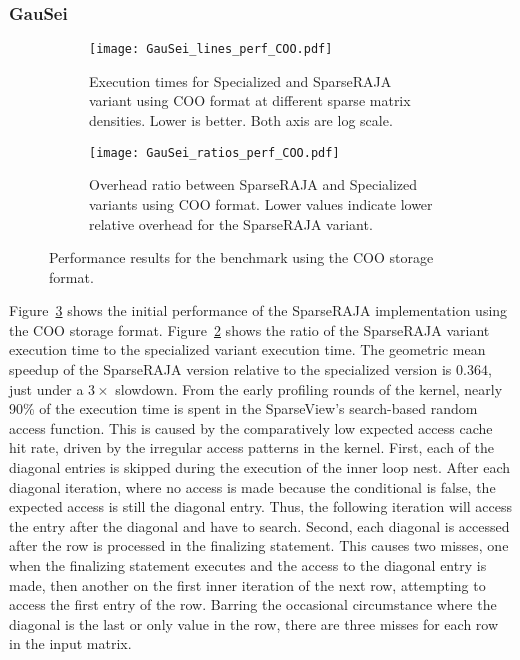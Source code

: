 \subsubsection{GauSei}
\begin{figure}
  \begin{subfigure}{0.49\columnwidth}
    \texttt{[image: GauSei\_lines\_perf\_COO.pdf]}
    \caption{Execution times for Specialized and SparseRAJA variant using COO format at different sparse matrix densities. Lower is better. Both axis are log scale.}\label{GauSeiExecTimeCOO}
  \end{subfigure}
  \hspace{0.02\columnwidth}
  \begin{subfigure}{0.49\columnwidth}
    \texttt{[image: GauSei\_ratios\_perf\_COO.pdf]}
    \caption{Overhead ratio between SparseRAJA and Specialized variants using COO format. Lower values indicate lower relative overhead for the SparseRAJA variant.}\label{GauSeiRatioCOO}
  \end{subfigure}
  \caption{Performance results for the \GauSei{} benchmark using the COO storage format. }\label{GauSeiPerfCOO}
\end{figure}


Figure~\ref{GauSeiPerfCOO} shows the initial performance of the SparseRAJA implementation using the COO storage format.
Figure~\ref{GauSeiRatioCOO} shows the ratio of the SparseRAJA variant execution time to the specialized variant execution time.
The geometric mean speedup of the SparseRAJA version relative to the specialized version is $0.364$, just under a $3\times$ slowdown. 
From the early profiling rounds of the \GauSei{} kernel, nearly 90\% of the execution time is spent in the SparseView's search-based random access function.
This is caused by the comparatively low expected access cache hit rate, driven by the irregular access patterns in the kernel.
First, each of the diagonal entries is skipped during the execution of the inner loop nest.
After each diagonal iteration, where no access is made because the conditional is false, the expected access is still the diagonal entry. 
Thus, the following iteration will access the entry after the diagonal and have to search.
Second, each diagonal is accessed after the row is processed in the finalizing statement.
This causes two misses, one when the finalizing statement executes and the access to the diagonal entry is made, then another on the first inner iteration of the next row, attempting to access the first entry of the row.
Barring the occasional circumstance where the diagonal is the last or only value in the row, there are three misses for each row in the input matrix.

